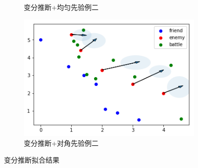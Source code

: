 \documentclass{article}
\begin{document}
\begin{figure}[ht]
\begin{subfigure}[b]{0.45\linewidth}
    \caption{变分推断+均匀先验例二}
  \end{subfigure}
  \begin{subfigure}[b]{0.45\linewidth}
    \includegraphics[width=\linewidth]{VI22.png}
    \caption{变分推断+对角先验例二}
  \end{subfigure}
  \caption{变分推断拟合结果}
  \label{fig:VI}
\end{figure}
\end{document}

